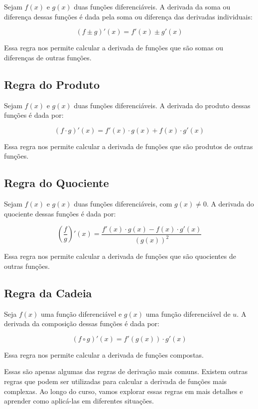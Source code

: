 \documentclass[12pt]{article}
\begin{document}
Sejam $f(x)$ e $g(x)$ duas funções diferenciáveis. A derivada da soma ou diferença dessas funções é dada pela soma ou diferença das derivadas individuais:

\[
(f \pm g)'(x) = f'(x) \pm g'(x)
\]

Essa regra nos permite calcular a derivada de funções que são somas ou diferenças de outras funções.

\subsection{Regra do Produto}

Sejam $f(x)$ e $g(x)$ duas funções diferenciáveis. A derivada do produto dessas funções é dada por:

\[
(f \cdot g)'(x) = f'(x) \cdot g(x) + f(x) \cdot g'(x)
\]

Essa regra nos permite calcular a derivada de funções que são produtos de outras funções.

\subsection{Regra do Quociente}

Sejam $f(x)$ e $g(x)$ duas funções diferenciáveis, com $g(x) \neq 0$. A derivada do quociente dessas funções é dada por:

\[
\left(\frac{f}{g}\right)'(x) = \frac{f'(x) \cdot g(x) - f(x) \cdot g'(x)}{(g(x))^2}
\]

Essa regra nos permite calcular a derivada de funções que são quocientes de outras funções.

\subsection{Regra da Cadeia}

Seja $f(x)$ uma função diferenciável e $g(x)$ uma função diferenciável de $u$. A derivada da composição dessas funções é dada por:

\[
(f \circ g)'(x) = f'(g(x)) \cdot g'(x)
\]

Essa regra nos permite calcular a derivada de funções compostas.

Essas são apenas algumas das regras de derivação mais comuns. Existem outras regras que podem ser utilizadas para calcular a derivada de funções mais complexas. Ao longo do curso, vamos explorar essas regras em mais detalhes e aprender como aplicá-las em diferentes situações.
\end{document}
